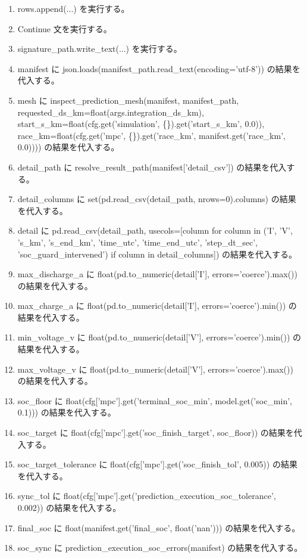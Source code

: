 \documentclass[a4paper,11pt]{article}
\begin{document}
\begin{enumerate}[leftmargin=1.8em]
\item       rows.append(...) を実行する。
\item       Continue 文を実行する。
\item     signature\_path.write\_text(...) を実行する。
\item   manifest に json.loads(manifest\_path.read\_text(encoding='utf-8')) の結果を代入する。
\item   mesh に inspect\_prediction\_mesh(manifest, manifest\_path, requested\_ds\_km=float(args.integration\_ds\_km), start\_s\_km=float(cfg.get('simulation', \{\}).get('start\_s\_km', 0.0)), race\_km=float(cfg.get('mpc', \{\}).get('race\_km', manifest.get('race\_km', 0.0)))) の結果を代入する。
\item   detail\_path に resolve\_result\_path(manifest['detail\_csv']) の結果を代入する。
\item   detail\_columns に set(pd.read\_csv(detail\_path, nrows=0).columns) の結果を代入する。
\item   detail に pd.read\_csv(detail\_path, usecols=[column for column in ('I', 'V', 's\_km', 's\_end\_km', 'time\_utc', 'time\_end\_utc', 'step\_dt\_sec', 'soc\_guard\_intervened') if column in detail\_columns]) の結果を代入する。
\item   max\_discharge\_a に float(pd.to\_numeric(detail['I'], errors='coerce').max()) の結果を代入する。
\item   max\_charge\_a に float(pd.to\_numeric(detail['I'], errors='coerce').min()) の結果を代入する。
\item   min\_voltage\_v に float(pd.to\_numeric(detail['V'], errors='coerce').min()) の結果を代入する。
\item   max\_voltage\_v に float(pd.to\_numeric(detail['V'], errors='coerce').max()) の結果を代入する。
\item   soc\_floor に float(cfg['mpc'].get('terminal\_soc\_min', model.get('soc\_min', 0.1))) の結果を代入する。
\item   soc\_target に float(cfg['mpc'].get('soc\_finish\_target', soc\_floor)) の結果を代入する。
\item   soc\_target\_tolerance に float(cfg['mpc'].get('soc\_finish\_tol', 0.005)) の結果を代入する。
\item   sync\_tol に float(cfg['mpc'].get('prediction\_execution\_soc\_tolerance', 0.002)) の結果を代入する。
\item   final\_soc に float(manifest.get('final\_soc', float('nan'))) の結果を代入する。
\item   soc\_sync に prediction\_execution\_soc\_errors(manifest) の結果を代入する。

\end{enumerate}
\end{document}
